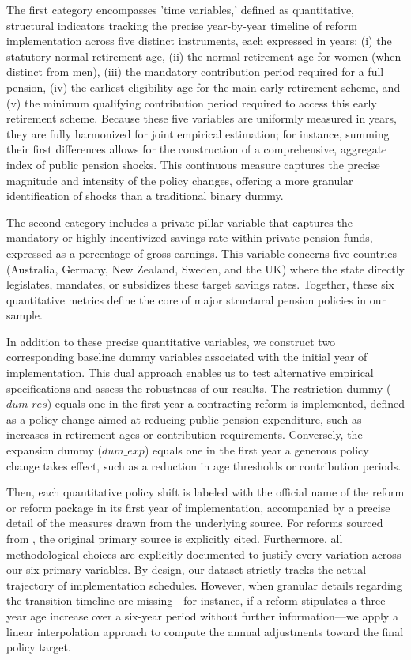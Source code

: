 \documentclass[11pt,english,a4paper, twoside, authoryear]{article}
\begin{document}
The first category encompasses 'time variables,' defined as quantitative, structural indicators tracking the precise year-by-year timeline of reform implementation across five distinct instruments, each expressed in years: (i) the statutory normal retirement age, (ii) the normal retirement age for women (when distinct from men), (iii) the mandatory contribution period required for a full pension, (iv) the earliest eligibility age for the main early retirement scheme, and (v) the minimum qualifying contribution period required to access this early retirement scheme. Because these five variables are uniformly measured in years, they are fully harmonized for joint empirical estimation; for instance, summing their first differences allows for the construction of a comprehensive, aggregate index of public pension shocks. This continuous measure captures the precise magnitude and intensity of the policy changes, offering a more granular identification of shocks than a traditional binary dummy.


The second category includes a private pillar variable that captures the mandatory or highly incentivized savings rate within private pension funds, expressed as a percentage of gross earnings. This variable concerns five countries (Australia, Germany, New Zealand, Sweden, and the UK) where the state directly legislates, mandates, or subsidizes these target savings rates. Together, these six quantitative metrics define the core of major structural pension policies in our sample.


In addition to these precise quantitative variables, we construct two corresponding baseline dummy variables associated with the initial year of implementation. This dual approach enables us to test alternative empirical specifications and assess the robustness of our results. The restriction dummy ($dum\_res$) equals one in the first year a contracting reform is implemented, defined as a policy change aimed at reducing public pension expenditure, such as increases in retirement ages or contribution requirements. Conversely, the expansion dummy ($dum\_exp$) equals one in the first year a generous policy change takes effect, such as a reduction in age thresholds or contribution periods.


Then, each quantitative policy shift is labeled with the official name of the reform or reform package in its first year of implementation, accompanied by a precise detail of the measures drawn from the underlying source. For reforms sourced from \citet{romp_political_2024}, the original primary source is explicitly cited. Furthermore, all methodological choices are explicitly documented to justify every variation across our six primary variables. By design, our dataset strictly tracks the actual trajectory of implementation schedules. However, when granular details regarding the transition timeline are missing—for instance, if a reform stipulates a three-year age increase over a six-year period without further information—we apply a linear interpolation approach to compute the annual adjustments toward the final policy target.
\end{document}
